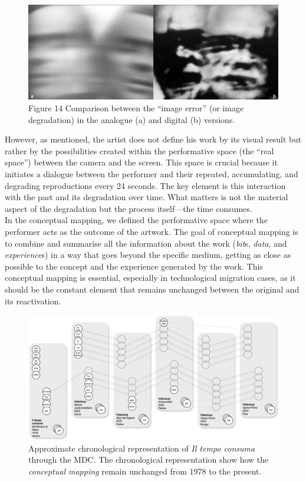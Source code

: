 \begin{figure}[!h]
    \centering
    \includegraphics[width=\linewidth]{chapters/appendix/a/image/figa-videoloop-comparison.jpg}
    \caption{Figure 14 Comparison between the ``image error'' (or image degradation) in the analogue (a) and digital (b) versions.}
    \label{fig:aa-videoloop-comparison}
\end{figure}

However, as mentioned, the artist does not define his work by its visual result but rather by the possibilities created within the performative space (the ``real space'') between the camera and the screen. This space is crucial because it initiates a dialogue between the performer and their repeated, accumulating, and degrading reproductions every 24 seconds. The key element is this interaction with the past and its degradation over time. What matters is not the material aspect of the degradation but the process itself—the time consumes.\\
In the conceptual mapping, we defined the performative space where the performer acts as the outcome of the artwork. The goal of conceptual mapping is to combine and summarise all the information about the work (\textit{bit}s, \textit{data}, and \textit{experience}s) in a way that goes beyond the specific medium, getting as close as possible to the concept and the experience generated by the work. This conceptual mapping is essential, especially in technological migration cases, as it should be the constant element that remains unchanged between the original and its reactivation.\\

\begin{figure}[!h]
    \includegraphics[width=\linewidth]{chapters/appendix/a/image/grapha-mdc.png}
    \caption{Approximate chronological representation of \textit{Il tempo consuma} through the MDC. The chronological representation show how the \textit{conceptual mapping} remain unchanged from 1978 to the present.}
    \label{fig:aa-graph_mdc}
\end{figure}

